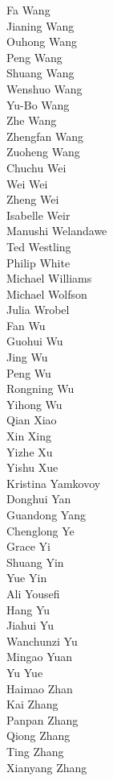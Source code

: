 Fa Wang\\
Jianing Wang\\
Ouhong Wang\\
Peng Wang\\
Shuang Wang\\
Wenshuo Wang\\
Yu-Bo Wang\\
Zhe Wang\\
Zhengfan Wang\\
Zuoheng Wang\\
Chuchu Wei\\
Wei Wei\\
Zheng Wei\\
Isabelle Weir\\
Manushi Welandawe\\
Ted Westling\\
Philip White\\
Michael Williams\\
Michael Wolfson\\
Julia Wrobel\\
Fan Wu\\
Guohui Wu\\
Jing Wu\\
Peng Wu\\
Rongning Wu\\
Yihong Wu\\
Qian Xiao\\
Xin Xing\\
Yizhe Xu\\
Yishu Xue\\
Kristina Yamkovoy\\
Donghui Yan\\
Guandong Yang\\
Chenglong Ye\\
Grace Yi\\
Shuang Yin\\
Yue Yin\\
Ali Yousefi\\
Hang Yu\\
Jiahui Yu\\
Wanchunzi Yu\\
Mingao Yuan\\
Yu Yue\\
Haimao Zhan\\
Kai Zhang\\
Panpan Zhang\\
Qiong Zhang\\
Ting Zhang\\
Xianyang Zhang\\
